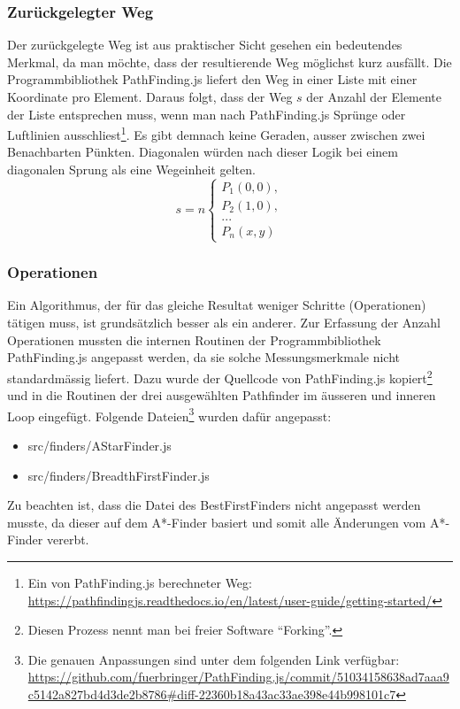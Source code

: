 \documentclass[12pt,a4paper,german]{report}
\begin{document}
\subsubsection{Zurückgelegter Weg}
Der zurückgelegte Weg ist aus praktischer Sicht gesehen ein bedeutendes Merkmal, da man möchte, dass der resultierende Weg möglichst kurz ausfällt. 
Die Programmbibliothek PathFinding.js liefert den Weg in einer Liste mit einer Koordinate pro Element. 
Daraus folgt, dass der Weg $s$ der Anzahl der Elemente der Liste entsprechen muss, wenn man nach PathFinding.js Sprünge oder Luftlinien ausschliest\footnote{Ein von PathFinding.js berechneter Weg: \url{https://pathfindingjs.readthedocs.io/en/latest/user-guide/getting-started/}}. 
Es gibt demnach keine Geraden, ausser zwischen zwei Benachbarten Pünkten.
Diagonalen würden nach dieser Logik bei einem diagonalen Sprung als eine Wegeinheit gelten.
\[ s = n
\begin{cases}
  P_1(0,0),\\
  P_2(1,0),\\
  ...\\
  P_n(x,y)
\end{cases}
\]
\subsubsection{Operationen}
Ein Algorithmus, der für das gleiche Resultat weniger Schritte (Operationen) tätigen muss, ist grundsätzlich besser als ein anderer. Zur Erfassung der Anzahl Operationen mussten die internen Routinen der Programmbibliothek PathFinding.js angepasst werden, da sie solche Messungsmerkmale nicht standardmässig liefert. Dazu wurde der Quellcode von PathFinding.js kopiert\footnote{Diesen Prozess nennt man bei freier Software ``Forking''.} und in die Routinen der drei ausgewählten Pathfinder im äusseren und inneren Loop eingefügt. Folgende Dateien\footnote{Die genauen Anpassungen sind unter dem folgenden Link verfügbar: \url{https://github.com/fuerbringer/PathFinding.js/commit/51034158638ad7aaa9c5142a827bd4d3de2b8786\#diff-22360b18a43ac33ae398e44b998101c7}} wurden dafür angepasst:
\begin{itemize}
\item{src/finders/AStarFinder.js}
\item{src/finders/BreadthFirstFinder.js}
\end{itemize}
Zu beachten ist, dass die Datei des BestFirstFinders nicht angepasst werden musste, da dieser auf dem A*-Finder basiert und somit alle Änderungen vom A*-Finder vererbt.
\end{document}
